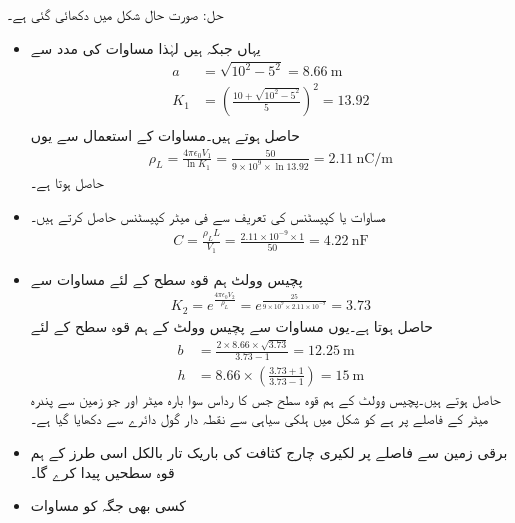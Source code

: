 حل: صورت حال شکل  میں دکھائی گئی ہے۔
\begin{itemize}
\item
یہاں  جبکہ  ہیں لہٰذا مساوات  کی مدد سے
\begin{align*}
a&=\sqrt{10^2-5^2}=\SI{8.66}{\meter}\\
K_1&=\left(\frac{10+\sqrt{10^2-5^2}}{5}\right)^2=13.92\\
\end{align*}
حاصل ہوتے ہیں۔مساوات  کے استعمال سے یوں
\begin{align*}
\rho_L=\frac{4\pi\epsilon_0 V_1}{\ln K_1}=\frac{50}{9 \times 10^9 \times \ln 13.92}=\SI{2.11}{\nano \coulomb \per \meter}
\end{align*}
حاصل ہوتا ہے۔
\item
مساوات  یا کپیسٹنس کی تعریف سے فی میٹر کپیسٹنس حاصل کرتے ہیں۔
\begin{align*}
C=\frac{\rho_L L}{V_1} =\frac{2.11 \times 10^{-9} \times 1}{50}=\SI{4.22}{\nano \farad }
\end{align*}
\item
پچیس وولٹ ہم قوہ سطح کے لئے مساوات  سے 
\begin{align*}
K_2=e^{\frac{4\pi\epsilon_0 V_2}{\rho_L}}=e^{\frac{25}{9\times 10^9 \times 2.11 \times 10^{-9}}}=3.73
\end{align*}
حاصل ہوتا ہے۔یوں مساوات  سے پچیس وولٹ کے ہم قوہ سطح کے لئے
\begin{align*}
b&=\frac{2\times 8.66 \times \sqrt{3.73}}{3.73-1}=\SI{12.25}{\meter}\\
h&=8.66 \times \left(\frac{3.73+1}{3.73-1} \right)=\SI{15}{\meter}
\end{align*}
حاصل ہوتے ہیں۔پچیس وولٹ کے ہم قوہ سطح جس کا رداس سوا بارہ میٹر اور جو زمین سے پندرہ میٹر کے فاصلے پر ہے  کو شکل میں ہلکی سیاہی سے نقطہ دار گول دائرے سے دکھایا گیا ہے۔
\item
برقی زمین سے   فاصلے پر  لکیری چارج کثافت کی باریک تار بالکل اسی طرز کے ہم قوہ سطحیں پیدا کرے گا۔ 
\item
کسی بھی جگہ  کو مساوات 


\end{itemize}

